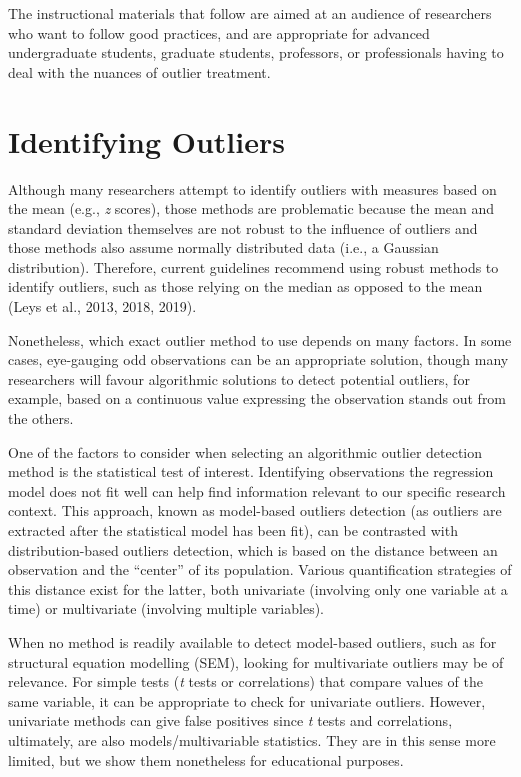 \documentclass{article}
\begin{document}
The instructional materials that follow are aimed at an audience of
researchers who want to follow good practices, and are appropriate for
advanced undergraduate students, graduate students, professors, or
professionals having to deal with the nuances of outlier treatment.

\hypertarget{identifying-outliers}{%
\section{Identifying Outliers}\label{identifying-outliers}}

Although many researchers attempt to identify outliers with measures
based on the mean (e.g., \emph{z} scores), those methods are problematic
because the mean and standard deviation themselves are not robust to the
influence of outliers and those methods also assume normally distributed
data (i.e., a Gaussian distribution). Therefore, current guidelines
recommend using robust methods to identify outliers, such as those
relying on the median as opposed to the mean (Leys et al., 2013, 2018,
2019).

Nonetheless, which exact outlier method to use depends on many factors.
In some cases, eye-gauging odd observations can be an appropriate
solution, though many researchers will favour algorithmic solutions to
detect potential outliers, for example, based on a continuous value
expressing the observation stands out from the others.

One of the factors to consider when selecting an algorithmic outlier
detection method is the statistical test of interest. Identifying
observations the regression model does not fit well can help find
information relevant to our specific research context. This approach,
known as model-based outliers detection (as outliers are extracted after
the statistical model has been fit), can be contrasted with
distribution-based outliers detection, which is based on the distance
between an observation and the ``center'' of its population. Various
quantification strategies of this distance exist for the latter, both
univariate (involving only one variable at a time) or multivariate
(involving multiple variables).

When no method is readily available to detect model-based outliers, such
as for structural equation modelling (SEM), looking for multivariate
outliers may be of relevance. For simple tests (\emph{t} tests or
correlations) that compare values of the same variable, it can be
appropriate to check for univariate outliers. However, univariate
methods can give false positives since \emph{t} tests and correlations,
ultimately, are also models/multivariable statistics. They are in this
sense more limited, but we show them nonetheless for educational
purposes.
\end{document}
